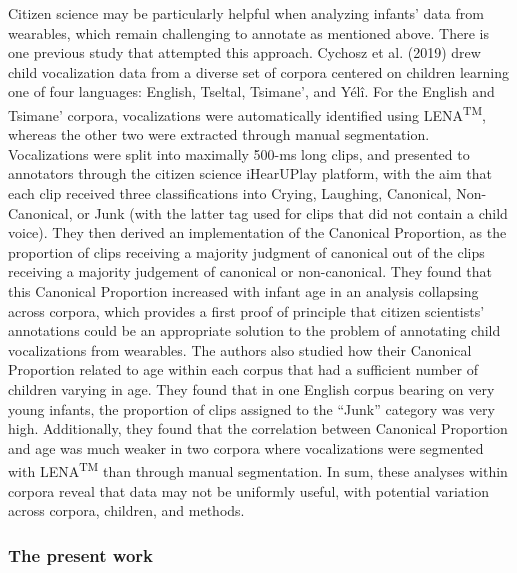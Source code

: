 \documentclass[english,,man,floatsintext]{apa6}
\begin{document}
Citizen science may be particularly helpful when analyzing infants' data from wearables, which remain challenging to annotate as mentioned above. There is one previous study that attempted this approach. Cychosz et al. (2019) drew child vocalization data from a diverse set of corpora centered on children learning one of four languages: English, Tseltal, Tsimane', and Yélî. For the English and Tsimane' corpora, vocalizations were automatically identified using LENA\textsuperscript{TM}, whereas the other two were extracted through manual segmentation. Vocalizations were split into maximally 500-ms long clips, and presented to annotators through the citizen science iHearUPlay platform, with the aim that each clip received three classifications into Crying, Laughing, Canonical, Non-Canonical, or Junk (with the latter tag used for clips that did not contain a child voice). They then derived an implementation of the Canonical Proportion, as the proportion of clips receiving a majority judgment of canonical out of the clips receiving a majority judgement of canonical or non-canonical. They found that this Canonical Proportion increased with infant age in an analysis collapsing across corpora, which provides a first proof of principle that citizen scientists' annotations could be an appropriate solution to the problem of annotating child vocalizations from wearables. The authors also studied how their Canonical Proportion related to age within each corpus that had a sufficient number of children varying in age. They found that in one English corpus bearing on very young infants, the proportion of clips assigned to the \enquote{Junk} category was very high. Additionally, they found that the correlation between Canonical Proportion and age was much weaker in two corpora where vocalizations were segmented with LENA\textsuperscript{TM} than through manual segmentation. In sum, these analyses within corpora reveal that data may not be uniformly useful, with potential variation across corpora, children, and methods.

\hypertarget{the-present-work}{%
\subsubsection{The present work}\label{the-present-work}}
\end{document}
